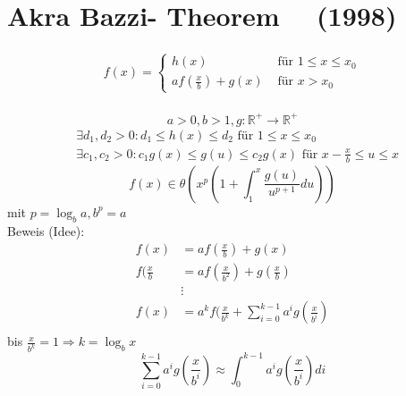 \documentclass[a4paper,twoside,10pt]{report}
\begin{document}
{\section{Akra Bazzi- Theorem \, \, (1998)}
\begin{align*}
f(x)=\left\{\begin{array}{ll}
h(x)&\mbox{ für }1\le  x\le x_0\\
af(\frac{x}{b})+g(x)&\mbox{ für }x>x_0
\end{array}\right.
\end{align*}
\\[.5em]
\[a>0,b>1,g:\mathbb R^+\rightarrow\mathbb R^+\]
\small
\begin{align*}
&\exists d_1,d_2>0: d_1\le h(x)\le d_2\mbox{ für }1\le x\le x_0\\
&\exists c_1,c_2>0:c_1g(x)\le g(u)\le c_2g(x)\mbox{ für }x-\frac{x}{b}\le u \le x 
\end{align*}
\normalsize
\[f(x)\in\theta(x^p(1+\int_1^x\frac{g(u)}{u^{p+1}}du))\]
mit $p=\log_ba,b^p=a$\\
Beweis (Idee):
\begin{align*}
f(x)&=af(\frac{x}{b})+g(x)\\
f(\frac{x}{b}&=af(\frac{x}{b^2})+g(\frac{x}{b})\\
&\vdots\\
f(x)&=a^kf(\frac{x}{b^k}+\sum_{i=0}^{k-1}a^ig(\frac{x}{b^i})\\
\end{align*}
bis $\frac{x}{b^k}=1\Rightarrow k=\log_bx$\\[.5em]
\[\sum_{i=0}^{k-1}a^ig(\frac{x}{b^i})\approx \int_0^{k-1}a^ig(\frac{x}{b^i})di\]
}
\end{document}

